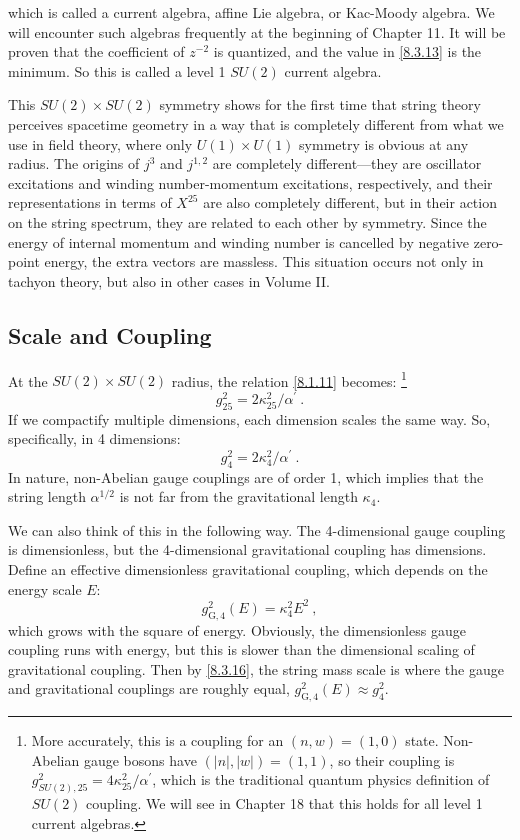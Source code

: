 which is called a current algebra, affine Lie algebra, or Kac-Moody algebra.
We will encounter such algebras frequently at the beginning of Chapter 11. It will be proven that the coefficient of $z^{-2}$ is quantized, 
and the value in \eqref{8.3.13} is the minimum. So this is called a level 1 $SU(2)$ current algebra.

This $S U(2) \times S U(2)$ symmetry shows for the first time that string theory perceives spacetime geometry in a way that is completely different from what we use in field theory, 
where only $U(1) \times U(1)$ symmetry is obvious at any radius. 
The origins of $j^{3}$ and $j^{1,2}$ are completely different—they are oscillator excitations and winding number-momentum excitations, respectively, 
and their representations in terms of $X^{25}$ are also completely different, but in their action on the string spectrum, they are related to each other by symmetry. Since the energy of internal momentum and winding number is cancelled by negative zero-point energy, the extra vectors are massless. 
This situation occurs not only in tachyon theory, but also in other cases in Volume II.

\subsection*{Scale and Coupling}

At the $S U(2) \times S U(2)$ radius, the relation \eqref{8.1.11} becomes:
\footnote{More accurately, this is a coupling for an $(n, w)=(1,0)$ state. Non-Abelian gauge bosons have $(|n|,|w|)=(1,1)$, 
	so their coupling is $g_{S U(2), 25}^{2}=4 \kappa_{25}^{2} / \alpha^{\prime}$, which is the traditional quantum physics definition of $SU(2)$ coupling. 
	We will see in Chapter 18 that this holds for all level 1 current algebras.}
\begin{equation}
	g_{25}^{2}=2 \kappa_{25}^{2} / \alpha^{\prime} \:. \label{8.3.15}
\end{equation}
If we compactify multiple dimensions, each dimension scales the same way. So, specifically, in 4 dimensions:
\begin{equation}
	g_{4}^{2}=2 \kappa_{4}^{2} / \alpha^{\prime} \:. \label{8.3.16}
\end{equation}
In nature, non-Abelian gauge couplings are of order 1, which implies that the string length $\alpha^{1 / 2}$ is not far from the gravitational length $\kappa_{4}$.

We can also think of this in the following way. The 4-dimensional gauge coupling is dimensionless, but the 4-dimensional gravitational coupling has dimensions. Define an effective dimensionless gravitational coupling, which depends on the energy scale $E$:
\begin{equation}
	g_{\mathrm{G}, 4}^{2}(E)=\kappa_{4}^{2} E^{2} \:, \label{8.3.17}
\end{equation}
which grows with the square of energy. Obviously, the dimensionless gauge coupling runs with energy, but this is slower than the dimensional scaling of gravitational coupling. 
Then by \eqref{8.3.16}, the string mass scale is where the gauge and gravitational couplings are roughly equal, 
$g_{\mathrm{G}, 4}^{2}(E) \approx g_{4}^{2}$.

